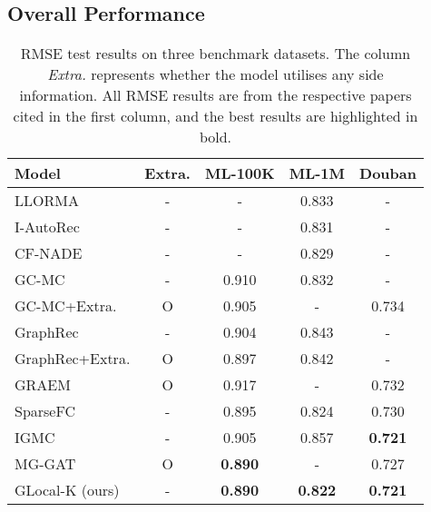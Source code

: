 \documentclass[sigconf]{acmart}
\begin{document}
\subsection{Overall Performance}
\begin{table}[t]
\caption{RMSE test results on three benchmark datasets. The column \textit{Extra.} represents whether the model utilises any side information. All RMSE results are from the respective papers cited in the first column, and the best results are highlighted in bold.}
\vspace{-0.3cm}
\label{tab:RMSE_results}
{\small
\begin{tabular}{lcccc}
\hline
\textbf{Model} & \textbf{Extra.} & \multicolumn{1}{c}{\textbf{ML-100K}} & \multicolumn{1}{c}{\textbf{ML-1M}} & \multicolumn{1}{c}{\textbf{Douban}} \\ \hline
LLORMA\cite{lee2016llorma} & - & - & 0.833 & - \\
I-AutoRec\cite{sedhain2015autorec} & - & - & 0.831 & - \\
CF-NADE\cite{zheng2016neural} & - & - & 0.829 & - \\
GC-MC\cite{berg2018graph} & - & 0.910 & 0.832 & - \\
GC-MC+Extra.\cite{berg2018graph} & O & 0.905 & - & 0.734 \\
GraphRec\cite{rashed2019attribute} & - & 0.904 & 0.843 & - \\
GraphRec+Extra.\cite{rashed2019attribute} & O & 0.897 & 0.842 & - \\
GRAEM\cite{strahl2020scalable} & O & 0.917 & - & 0.732 \\
SparseFC\cite{muller2018kernelized} & - & 0.895 & 0.824 & 0.730 \\
IGMC\cite{zhang2019inductive} & - & 0.905 & 0.857 & \textbf{0.721} \\
MG-GAT\cite{ugla2020interpretable} & O & \textbf{0.890} & - & 0.727 \\
GLocal-K (ours) & - & \textbf{0.890} & \textbf{0.822} & \textbf{0.721} \\ \hline
\end{tabular}
}
\vspace{-4mm}
\end{table}
\end{document}
